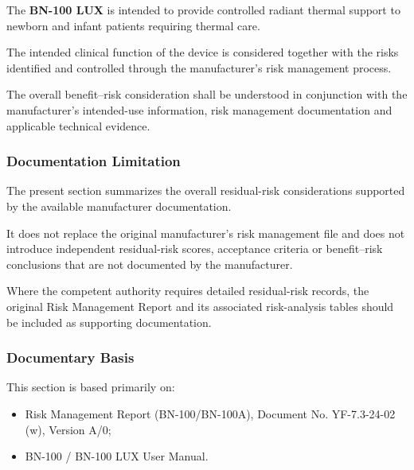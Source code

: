 The \textbf{BN-100 LUX} is intended to provide controlled radiant thermal
support to newborn and infant patients requiring thermal care.

The intended clinical function of the device is considered together with
the risks identified and controlled through the manufacturer's risk
management process.

The overall benefit--risk consideration shall be understood in conjunction
with the manufacturer's intended-use information, risk management
documentation and applicable technical evidence.

\subsubsection{Documentation Limitation}

The present section summarizes the overall residual-risk considerations
supported by the available manufacturer documentation.

It does not replace the original manufacturer's risk management file and
does not introduce independent residual-risk scores, acceptance criteria or
benefit--risk conclusions that are not documented by the manufacturer.

Where the competent authority requires detailed residual-risk records, the
original Risk Management Report and its associated risk-analysis tables
should be included as supporting documentation.

\subsubsection{Documentary Basis}

This section is based primarily on:

\begin{itemize}

    \item Risk Management Report (BN-100/BN-100A), Document No.
    YF-7.3-24-02 (w), Version A/0;

    \item BN-100 / BN-100 LUX User Manual.

\end{itemize}

